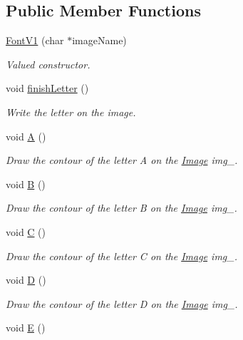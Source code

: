 \subsection*{Public Member Functions}
\begin{DoxyCompactItemize}
\item 
\mbox{\hyperlink{class_font_v1_ada1ed699d42679f81146af4bc20db006}{Font\+V1}} (char $\ast$image\+Name)
\begin{DoxyCompactList}\small\item\em Valued constructor. \end{DoxyCompactList}\item 
void \mbox{\hyperlink{class_font_v1_a29e1b96b06056aad8542c3d2ac79ebf2}{finish\+Letter}} ()
\begin{DoxyCompactList}\small\item\em Write the letter on the image. \end{DoxyCompactList}\item 
void \mbox{\hyperlink{class_font_v1_a29afd2079bc41cdec9d3de6bb4e1be52}{A}} ()
\begin{DoxyCompactList}\small\item\em Draw the contour of the letter A on the \mbox{\hyperlink{class_image}{Image}} img\+\_\+. \end{DoxyCompactList}\item 
void \mbox{\hyperlink{class_font_v1_a620ee7876d479807f73481f27be48f2a}{B}} ()
\begin{DoxyCompactList}\small\item\em Draw the contour of the letter B on the \mbox{\hyperlink{class_image}{Image}} img\+\_\+. \end{DoxyCompactList}\item 
void \mbox{\hyperlink{class_font_v1_a80602716ae6907fa518fbb50eeda2515}{C}} ()
\begin{DoxyCompactList}\small\item\em Draw the contour of the letter C on the \mbox{\hyperlink{class_image}{Image}} img\+\_\+. \end{DoxyCompactList}\item 
void \mbox{\hyperlink{class_font_v1_a3f4558aabfef6e0783c2294aecf215d0}{D}} ()
\begin{DoxyCompactList}\small\item\em Draw the contour of the letter D on the \mbox{\hyperlink{class_image}{Image}} img\+\_\+. \end{DoxyCompactList}\item 
void \mbox{\hyperlink{class_font_v1_ab8a34299af7a36cfd94c2691b579a0fa}{E}} ()

\end{DoxyCompactItemize}

